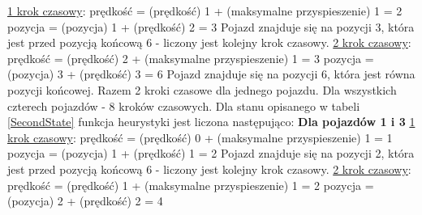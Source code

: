 \underline{1 krok czasowy}:
\newline
\newline
prędkość = (prędkość) 1 + (maksymalne przyspieszenie) 1 = 2
\newline
pozycja = (pozycja) 1 + (prędkość) 2 = 3
\newline
\newline
Pojazd znajduje się na pozycji 3, która jest przed pozycją końcową 6 - liczony jest kolejny krok czasowy.
\newline
\newline
\underline{2 krok czasowy}:
\newline
\newline
prędkość = (prędkość) 2 + (maksymalne przyspieszenie) 1 = 3
\newline
pozycja = (pozycja) 3 + (prędkość) 3 = 6
\newline
\newline
Pojazd znajduje się na pozycji 6, która jest równa pozycji końcowej.
\newline
\newline
Razem 2 kroki czasowe dla jednego pojazdu. Dla wszystkich czterech pojazdów - 8 kroków czasowych.
\newline
\newline
\newline
Dla stanu opisanego w tabeli \ref{SecondState} funkcja heurystyki jest liczona następująco:
\newline
\newline
\textbf{Dla pojazdów 1 i 3}
\newline
\newline
\underline{1 krok czasowy}:
\newline
\newline
prędkość = (prędkość) 0 + (maksymalne przyspieszenie) 1 = 1
\newline
pozycja = (pozycja) 1 + (prędkość) 1 = 2
\newline
\newline
Pojazd znajduje się na pozycji 2, która jest przed pozycją końcową 6 - liczony jest kolejny krok czasowy.
\newline
\newline
\underline{2 krok czasowy}:
\newline
\newline
prędkość = (prędkość) 1 + (maksymalne przyspieszenie) 1 = 2
\newline
pozycja = (pozycja) 2 + (prędkość) 2 = 4
\newline
\newline
